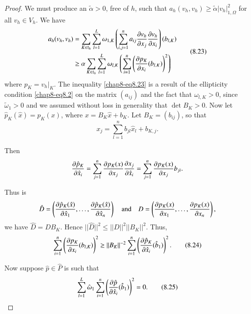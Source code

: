 \begin{proof}
We must produce an $\tilde{\alpha}>0$, free of $h$, such that
$a_{h}(v_{h},v_{h})\geq \tilde{\alpha}|v_{h}|^{2}_{1,\Omega}$ for all
$v_{h}\in V_{h}$. We have
\begin{equation*}
\begin{split}
a_{h}(v_{h},v_{h}) &=
\sum\limits_{K\in\mathfrak{t}_{h}}\sum_{l=1}^L\omega_{1,K}\left(\sum^{n}_{i,j=1}a_{ij}\frac{\partial
  v_{h}}{\partial x_{j}}\frac{\partial v_{h}}{\partial x_{i}}\right)(b_{l,K})\\
&\geq
\alpha\sum_{K\in\mathfrak{t}_{h}}\sum^{L}_{l=1}\omega_{l,K}\left(\sum^{n}_{i=1}\left(\frac{\partial
  p_{K}}{\partial x_{i}}(b_{l.K})\right)^{2}\right)
\end{split}\tag{8.23}\label{chap8-eq8.23} 
\end{equation*}
where $p_{K}=v_{h}|_{K}$. The inequality \eqref{chap8-eq8.23} is a
result of the ellipticity condition \eqref{chap8-eq8.2} on the matrix
$(a_{ij})$ and the fact that $\omega_{l,K}>0$, since
$\widetilde{\omega}_{1}>0$ and we assumed without loss in generality
that $\det B_{K}>0$. Now let $\hat{p}_{K}(\widehat{x})=p_{K}(x)$,
where $x=B_{K}\hat{x}+b_{K}$. Let $B_{K}=(b_{ij})$, so that
$$
x_{j}=\sum^{n}_{l=1}b_{jl}\hat{x}_{l}+b_{K,j}.
$$

Then 
$$
\frac{\partial \hat{p}_{K}}{\partial \hat{x}_{i}}=\sum^{n}_{j=1}\frac{\partial
  p_{K}(x)}{\partial x_{j}}\frac{\partial x_{j}}{\partial
  \hat{x}_{i}}=\sum^{n}_{j=1}\frac{\partial p_{K}(x)}{\partial x_{j}}b_{ji}.
$$

Thus is
$$
\hat{D}=\left(\frac{\partial \hat{p}_{K}(\hat{x})}{\partial
  \hat{x}_{1}},\ldots,\frac{\partial \hat{p}_{K}(\hat{x})}{\partial
  \hat{x}_{n}}\right)\quad\text{and}\quad D=\left(\frac{\partial
  p_{K}(x)}{\partial x_{1}},\ldots,\frac{\partial p_{K}(x)}{\partial x_{n}}\right),
$$
we have $\hat{D}=DB_{K}$. Hence $||\hat{D}||^{2}\leq
||D||^{2}||B_{K}||^{2}$. Thus, 
\begin{equation*}
\sum^{n}_{i=1}\left(\frac{\partial p_{K}}{\partial x_{i}}(b_{l,K})\right)^{2}\geq
||B_{K}||^{-2}\sum^{n}_{i=1}\left(\frac{\partial \hat{p}_{K}}{\partial
  \hat{x}_{i}}(\hat{b}_{1})\right)^{2}.\tag{8.24}\label{chap8-eq8.24}
\end{equation*}\pageoriginale

Now suppose $\hat{p}\in\hat{P}$ is such that
\begin{equation*}
\sum^{L}_{l=1}\hat{\omega}_{1}\sum^{n}_{i=1}\left(\frac{\partial \hat{p}}{\partial
  \hat{x}_{i}}(\hat{b}_{1})\right)^{2}=0.\tag{8.25}\label{chap8-eq8.25} 
\end{equation*}


\end{proof}
